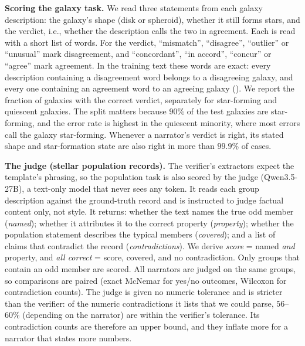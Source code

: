 \textbf{Scoring the galaxy task.}\label{sec:galaxyscore} We read three statements
from each galaxy description: the galaxy's shape (disk or spheroid), whether it
still forms stars, and the verdict, i.e., whether the description calls the two in
agreement. Each is read with a short list of words. For the verdict, ``mismatch'',
``disagree'', ``outlier'' or ``unusual'' mark disagreement, and ``concordant'',
``in accord'', ``concur'' or ``agree'' mark agreement. In the training text these
words are exact: every description containing a disagreement word belongs to a
disagreeing galaxy, and every one containing an agreement word to an agreeing
galaxy (). We report the fraction of galaxies with the correct
verdict, separately for star-forming and quiescent galaxies. The split matters
because $90\%$ of the test galaxies are star-forming, and the error rate is highest
in the quiescent minority, where most errors call the galaxy star-forming. Whenever a narrator's verdict is right, its stated shape and
star-formation state are also right in more than $99.9\%$ of cases.

\textbf{The judge (stellar population records).} The verifier's extractors
expect the template's phrasing, so the population task is also scored by the
judge (Qwen3.5-27B), a text-only model that never sees any token. It reads each group
description against the ground-truth record and is instructed to judge factual
content only, not style. It returns: whether the text names the true odd member
(\emph{named}); whether it attributes it to the correct property
(\emph{property}); whether the population statement describes the typical
members (\emph{covered}); and a list of claims that contradict the record
(\emph{contradictions}). We derive \emph{score} = named \emph{and} property,
and \emph{all correct} = score, covered, and no contradiction. Only groups that
contain an odd member are scored. All narrators are judged on the same groups, so
comparisons are paired (exact McNemar for yes/no outcomes, Wilcoxon for
contradiction counts). The judge is given no numeric tolerance and is stricter
than the verifier: of the numeric contradictions it lists that we could parse, $56$--$60\%$ (depending on the narrator) are within
the verifier's tolerance. Its contradiction counts are therefore an upper bound,
and they inflate more for a narrator that states more numbers.

